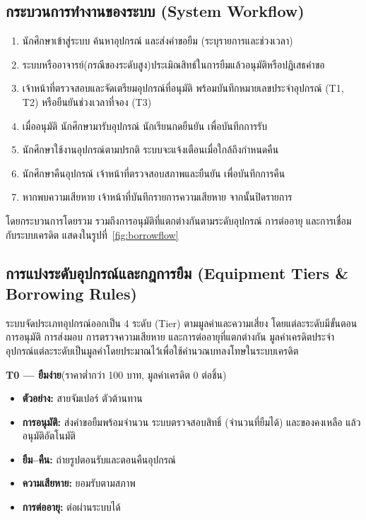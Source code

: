 

\subsection{กระบวนการทำงานของระบบ (System Workflow)}

\begin{enumerate}
  \item นักศึกษาเข้าสู่ระบบ ค้นหาอุปกรณ์ และส่งคำขอยืม (ระบุรายการและช่วงเวลา)
  \item ระบบหรืออาจารย์(กรณีของระดับสูง)ประเมิณสิทธ์ในการยืมแล้วอนุมัติหรือปฏิเสธคำขอ
  \item เจ้าหน้าที่ตรวจสอบและจัดเตรียมอุปกรณ์ที่อนุมัติ พร้อมบันทึกหมายเลขประจำอุปกรณ์ (T1, T2) หรือยืนยันช่วงเวลาที่จอง (T3)
  \item เมื่ออนุมัติ นักศึกษามารับอุปกรณ์ นักเรียนกดยืนยัน เพื่อบันทึกการรับ
  \item นักศึกษาใช้งานอุปกรณ์ตามปรกติ ระบบจะแจ้งเตือนเมื่อใกล้ถึงกำหนดคืน
  \item นักศึกษาคืนอุปกรณ์ เจ้าหน้าที่ตรวจสอบสภาพและยืนยัน เพื่อบันทึกการคืน
  \item หากพบความเสียหาย เจ้าหน้าที่บันทึกรายการความเสียหาย จากนั้นปิดรายการ
\end{enumerate}

โดยกระบวนการโดยรวม รวมถึงการอนุมัติที่แตกต่างกันตามระดับอุปกรณ์ การต่ออายุ และการเชื่อมกับระบบเครดิต แสดงในรูปที่~\ref{fig:borrowflow}



\subsection{การแบ่งระดับอุปกรณ์และกฎการยืม (Equipment Tiers \& Borrowing Rules)}
\label{subsec:tiers}

\hspace*{2em}ระบบจัดประเภทอุปกรณ์ออกเป็น 4 ระดับ (Tier) ตามมูลค่าและความเสี่ยง โดยแต่ละระดับมีขั้นตอนการอนุมัติ การส่งมอบ การตรวจความเสียหาย และการต่ออายุที่แตกต่างกัน มูลค่าเครดิตประจำอุปกรณ์แต่ละระดับเป็นมูลค่าโดยประมาณไว้เพื่อใช้คำนวณบทลงโทษในระบบเครดิต

\noindent\textbf{T0 — ยืมง่าย}\quad(ราคาต่ำกว่า 100 บาท, มูลค่าเครดิต 0 ต่อชิ้น)
\begin{itemize}
  \item \textbf{ตัวอย่าง:} สายจัมเปอร์ ตัวต้านทาน
  \item \textbf{การอนุมัติ:} ส่งคำขอยืมพร้อมจำนวน ระบบตรวจสอบสิทธิ์ (จำนวนที่ยืมได้) และของคงเหลือ แล้วอนุมัติอัตโนมัติ
  \item \textbf{ยืม–คืน:} ถ่ายรูปตอนรับและตอนคืนอุปกรณ์
  \item \textbf{ความเสียหาย:} ยอมรับตามสภาพ
  \item \textbf{การต่ออายุ:} ต่อผ่านระบบได้
\end{itemize}

